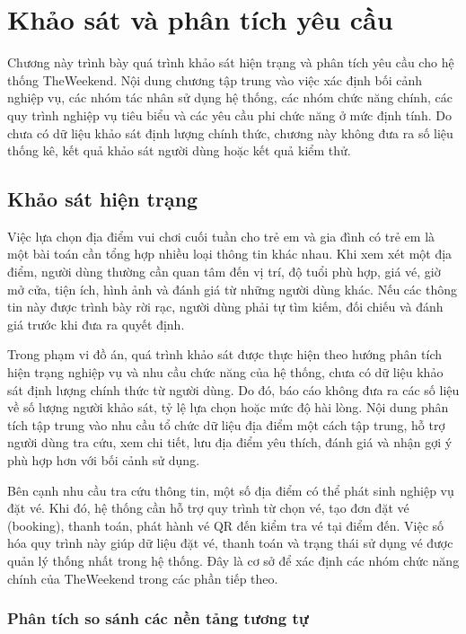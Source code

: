 ﻿\documentclass[../DoAn.tex]{subfiles}
\begin{document}
\chapter{Khảo sát và phân tích yêu cầu}

Chương này trình bày quá trình khảo sát hiện trạng và phân tích yêu cầu cho hệ thống TheWeekend. Nội dung chương tập trung vào việc xác định bối cảnh nghiệp vụ, các nhóm tác nhân sử dụng hệ thống, các nhóm chức năng chính, các quy trình nghiệp vụ tiêu biểu và các yêu cầu phi chức năng ở mức định tính. Do chưa có dữ liệu khảo sát định lượng chính thức, chương này không đưa ra số liệu thống kê, kết quả khảo sát người dùng hoặc kết quả kiểm thử.

\section{Khảo sát hiện trạng}

Việc lựa chọn địa điểm vui chơi cuối tuần cho trẻ em và gia đình có trẻ em là một bài toán cần tổng hợp nhiều loại thông tin khác nhau. Khi xem xét một địa điểm, người dùng thường cần quan tâm đến vị trí, độ tuổi phù hợp, giá vé, giờ mở cửa, tiện ích, hình ảnh và đánh giá từ những người dùng khác. Nếu các thông tin này được trình bày rời rạc, người dùng phải tự tìm kiếm, đối chiếu và đánh giá trước khi đưa ra quyết định.

Trong phạm vi đồ án, quá trình khảo sát được thực hiện theo hướng phân tích hiện trạng nghiệp vụ và nhu cầu chức năng của hệ thống, chưa có dữ liệu khảo sát định lượng chính thức từ người dùng. Do đó, báo cáo không đưa ra các số liệu về số lượng người khảo sát, tỷ lệ lựa chọn hoặc mức độ hài lòng. Nội dung phân tích tập trung vào nhu cầu tổ chức dữ liệu địa điểm một cách tập trung, hỗ trợ người dùng tra cứu, xem chi tiết, lưu địa điểm yêu thích, đánh giá và nhận gợi ý phù hợp hơn với bối cảnh sử dụng.

Bên cạnh nhu cầu tra cứu thông tin, một số địa điểm có thể phát sinh nghiệp vụ đặt vé. Khi đó, hệ thống cần hỗ trợ quy trình từ chọn vé, tạo đơn đặt vé (booking), thanh toán, phát hành vé QR đến kiểm tra vé tại điểm đến. Việc số hóa quy trình này giúp dữ liệu đặt vé, thanh toán và trạng thái sử dụng vé được quản lý thống nhất trong hệ thống. Đây là cơ sở để xác định các nhóm chức năng chính của TheWeekend trong các phần tiếp theo.

\subsection{Phân tích so sánh các nền tảng tương tự}
\end{document}
